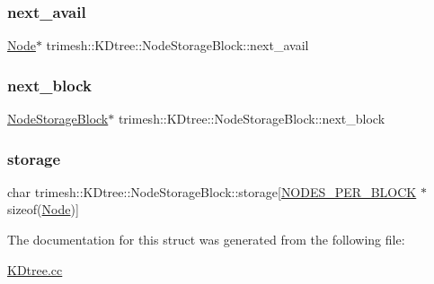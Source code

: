 \subsubsection{\texorpdfstring{next\+\_\+avail}{next\_avail}}
{\footnotesize\ttfamily \hyperlink{structtrimesh_1_1KDtree_1_1Node}{Node}$\ast$ trimesh\+::\+K\+Dtree\+::\+Node\+Storage\+Block\+::next\+\_\+avail}

\mbox{\label{structtrimesh_1_1KDtree_1_1NodeStorageBlock_aeb244f2daeda3453d676b40c7de5c3ad}} 
\subsubsection{\texorpdfstring{next\+\_\+block}{next\_block}}
{\footnotesize\ttfamily \hyperlink{structtrimesh_1_1KDtree_1_1NodeStorageBlock}{Node\+Storage\+Block}$\ast$ trimesh\+::\+K\+Dtree\+::\+Node\+Storage\+Block\+::next\+\_\+block}

\mbox{\label{structtrimesh_1_1KDtree_1_1NodeStorageBlock_a0958126dfe8d25e2f58c8f03f45869a0}} 
\subsubsection{\texorpdfstring{storage}{storage}}
{\footnotesize\ttfamily char trimesh\+::\+K\+Dtree\+::\+Node\+Storage\+Block\+::storage\mbox{[}\hyperlink{structtrimesh_1_1KDtree_1_1NodeStorageBlock_a0fc26f8428cdf04b3e99d1b57770292fabed02221dc8cfae72d1a32f807c5316f}{N\+O\+D\+E\+S\+\_\+\+P\+E\+R\+\_\+\+B\+L\+O\+CK} $\ast$sizeof(\hyperlink{structtrimesh_1_1KDtree_1_1Node}{Node})\mbox{]}}



The documentation for this struct was generated from the following file\+:\begin{DoxyCompactItemize}
\item 
\hyperlink{KDtree_8cc}{K\+Dtree.\+cc}\end{DoxyCompactItemize}

